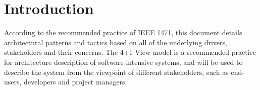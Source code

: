 \section{Introduction}

According to the recommended practice of IEEE 1471, this document details architectural patterns and tactics based on all of the underlying drivers, stakeholders and their concerns. The 4+1 View model is a recommended practice for architecture description of software-intensive systems, and will be used to describe the system from the viewpoint of different stakeholders, such as end-users, developers and project managers.



